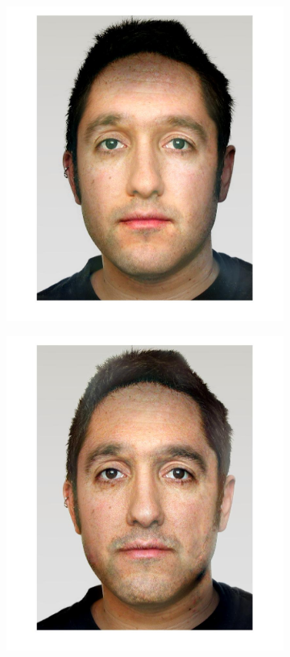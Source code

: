 \documentclass[a4paper]{iacas}
\begin{document}
\begin{figure}[!htbp]
	
	\begin{subfigure}[b]{0.32\textwidth}
		\includegraphics[width=\textwidth]{image_61_0.jpg}
		\caption{}
		\label{fig:i_61_0}
	\end{subfigure}
	\begin{subfigure}[b]{0.32\textwidth}
		\includegraphics[width=\textwidth]{image_61_9.jpg}

\end{subfigure}
\end{figure}
\end{document}
